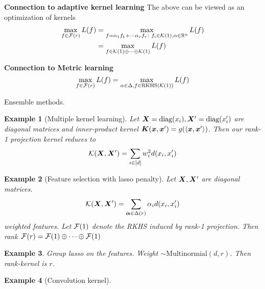 \documentclass[12pt]{article}
\newtheorem{example}{Example}
\begin{document}
{\bf Connection to adaptive kernel learning} The above can be viewed as an optimization of kernels 
\begin{align}
\max_{f\in \mathcal{F}(r)}L(f)&=\max_{f=\alpha_1 f_1+\cdots \alpha_r f_r\colon f_i\in\mathcal{K}(1), \alpha\in\mathbb{R}^n} L(f)\\
&=\max_{f\in \mathcal{K}(1)\oplus \cdots \oplus \mathcal{K}(1)}L(f)
\end{align}

{\bf Connection to Metric learning}
\[
\max_{f\in \mathcal{F}(r)}L(f)=\max_{\alpha \in \Delta, f\in \text{RKHS}(\mathcal{K}(1))} L(f)
\]

Ensemble methods. 

\begin{example} [Multiple kernel learning] Let $\bm X=\text{diag}(x_i),\bm X'=\text{diag}(x'_i)$ are diagonal matrices and inner-product kernel $\bm K(\bm x,\bm x')=g(\langle\bm x,\bm x'\rangle)$. Then our rank-1 projection kernel reduces to
\[
\mathcal{K}(\bm X,\bm X')=\sum_{i\in[d]} w^2_{i}d(x_i,x'_i) 
\]
\end{example}

\begin{example}[Feature selection with lasso penalty] Let $\bm X,\bm X'$ are diagonal matrices. 
\[
\mathcal{K}(\bm X,\bm X')=\sum_{\boldsymbol{\alpha}\in \Delta(r)}\alpha_id(x_i,x'_i)
\]
weighted features. 
Let $\mathcal{F}(1)$ denote the RKHS induced by rank-1 projection. Then rank $\mathcal{F}(r)=\mathcal{F}(1)\oplus\cdots\oplus\mathcal{F}(1)$
\end{example} 

\begin{example} Group lasso on the features. Weight $\sim \text{Multinormial}(d,r)$. Then rank-kernel is $r$.
\end{example}

\begin{example}[Convolution kernel]
\end{example}
\end{document}
